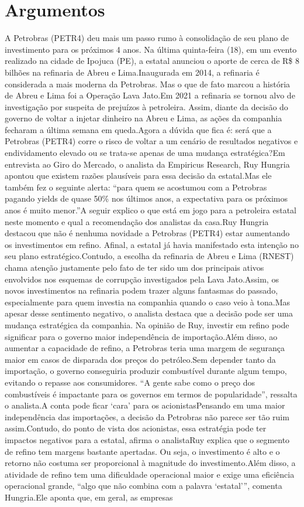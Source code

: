 \documentclass[
   article,       
   12pt,          
   oneside,       
   a4paper,       
   english,       
   brazil,        
   sumario=tradicional
   ]{abntex2}
\begin{document}
\section{Argumentos}
A Petrobras (PETR4) deu mais um passo rumo à consolidação de seu plano de investimento para os próximos 4 anos. Na última quinta-feira (18), em um evento realizado na cidade de Ipojuca (PE), a estatal anunciou o aporte de cerca de R\$ 8 bilhões na refinaria de Abreu e Lima.Inaugurada em 2014, a refinaria é considerada a mais moderna da Petrobras. Mas o que de fato marcou a história de Abreu e Lima foi a Operação Lava Jato.Em 2021 a refinaria se tornou alvo de investigação por suspeita de prejuízos à petroleira. Assim, diante da decisão do governo de voltar a injetar dinheiro na Abreu e Lima, as ações da companhia fecharam a última semana em queda.Agora a dúvida que fica é: será que a Petrobras (PETR4) corre o risco de voltar a um cenário de resultados negativos e endividamento elevado ou se trata-se apenas de uma mudança estratégica?Em entrevista ao Giro do Mercado, o analista da Empiricus Research, Ruy Hungria apontou que existem razões plausíveis para essa decisão da estatal.Mas ele também fez o seguinte alerta: “para quem se acostumou com a Petrobras pagando yields de quase 50\% nos últimos anos, a expectativa para os próximos anos é muito menor.”A seguir explico o que está em jogo para a petroleira estatal neste momento e qual a recomendação dos analistas da casa.Ruy Hungria destacou que não é nenhuma novidade a Petrobras (PETR4) estar aumentando os investimentos em refino. Afinal, a estatal já havia manifestado esta intenção no seu plano estratégico.Contudo, a escolha da refinaria de Abreu e Lima (RNEST) chama atenção justamente pelo fato de ter sido um dos principais ativos envolvidos nos esquemas de corrupção investigados pela Lava Jato.Assim, os novos investimentos na refinaria podem trazer alguns fantasmas do passado, especialmente para quem investia na companhia quando o caso veio à tona.Mas apesar desse sentimento negativo, o analista destaca que a decisão pode ser uma mudança estratégica da companhia. Na opinião de Ruy, investir em refino pode significar para o governo maior independência de importação.Além disso, ao aumentar a capacidade de refino, a Petrobras teria uma margem de segurança maior em casos de disparada dos preços do petróleo.Sem depender tanto da importação, o governo conseguiria produzir combustível durante algum tempo, evitando o repasse aos consumidores. “A gente sabe como o preço dos combustíveis é impactante para os governos em termos de popularidade”, ressalta o analista.A conta pode ficar ‘cara’ para os acionistasPensando em uma maior independência das importações, a decisão da Petrobras não parece ser tão ruim assim.Contudo, do ponto de vista dos acionistas, essa estratégia pode ter impactos negativos para a estatal, afirma o analistaRuy explica que o segmento de refino tem margens bastante apertadas. Ou seja, o investimento é alto e o retorno não costuma ser proporcional à magnitude do investimento.Além disso, a atividade de refino tem uma dificuldade operacional maior e exige uma eficiência operacional grande, “algo que não combina com a palavra ‘estatal’”, comenta Hungria.Ele aponta que, em geral, as empresas 
\end{document}
